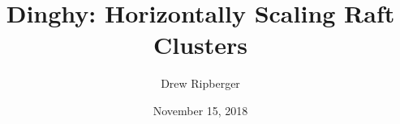 \documentclass[11pt, twocolumn]{article}
\title{Dinghy: Horizontally Scaling Raft Clusters}
\author{Drew Ripberger}
\date{November 15, 2018}
\begin{document}
  \maketitle
  \textbf{}
  
  
  
  
  
  
  
\end{document}
